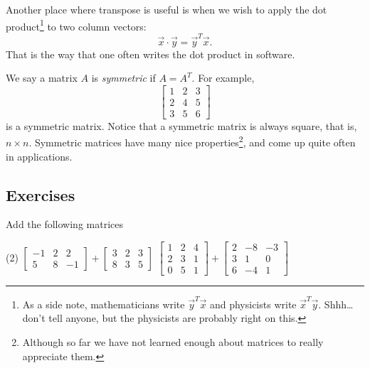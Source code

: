 Another place where transpose is useful is when we wish to apply the dot
product\footnote{As a side note, mathematicians
write $\vec{y}^T\vec{x}$ and physicists
write $\vec{x}^T\vec{y}$.  Shhh\ldots don't tell anyone, but the physicists
are probably right on this.}
to two column vectors:
\begin{equation*}
\vec{x} \cdot \vec{y} = \vec{y}^T \vec{x} .
\end{equation*}
That is the way that one often writes the dot product in software.

We say a matrix $A$ is \emph{symmetric}
if $A = A^T$.  For example,
\begin{equation*}
\begin{bmatrix}
1 & 2 & 3 \\
2 & 4 & 5 \\
3 & 5 & 6
\end{bmatrix}
\end{equation*}
is a symmetric matrix.  Notice that a symmetric matrix is always
square, that is, $n \times n$.  Symmetric matrices 
have many nice properties\footnote{Although so far we have not learned
enough about matrices to really appreciate them.},
and come up quite often in applications.

\subsection{Exercises}

\begin{exercise}
Add the following matrices
\begin{tasks}(2)
\task
$\begin{bmatrix}
-1 & 2 & 2 \\
5 & 8 & -1
\end{bmatrix}
+
\begin{bmatrix}
3 & 2 & 3 \\
8 & 3 & 5
\end{bmatrix}$
\task
$\begin{bmatrix}
1 & 2 & 4 \\
2 & 3 & 1 \\
0 & 5 & 1
\end{bmatrix}
+
\begin{bmatrix}
2 & -8 & -3 \\
3 & 1 & 0 \\
6 & -4 & 1
\end{bmatrix}$
\end{tasks}
\end{exercise}

